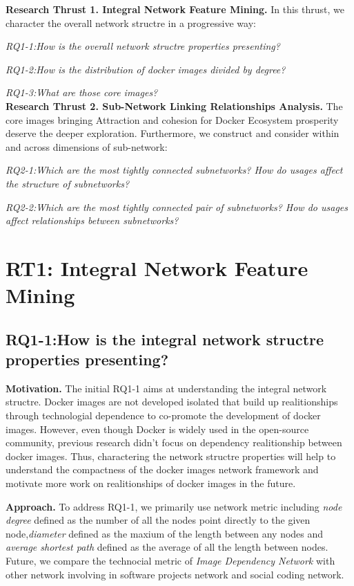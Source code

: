 \documentclass[sigconf]{acmart}
\begin{document}
\noindent\textbf{Research Thrust 1. Integral Network Feature Mining.} In this thrust, we character the overall network structre in a progressive way:

\emph{RQ1-1:How is the overall network structre properties presenting?}

\emph{RQ1-2:How is the distribution of docker images divided by degree?}

\emph{RQ1-3:What are those core images?}\\

\noindent\textbf{Research Thrust 2. Sub-Network Linking Relationships Analysis.} 
The core images bringing Attraction and cohesion for Docker Ecosystem prosperity deserve the deeper exploration. Furthermore, we construct and consider within and across dimensions of sub-network:

\emph{RQ2-1:Which are the most tightly connected subnetworks? How do usages affect the structure of subnetworks?}


\emph{RQ2-2:Which are the most tightly connected pair of subnetworks? How do usages affect relationships between subnetworks?}









\section{RT1: Integral Network Feature Mining}

\subsection{RQ1-1:How is the integral network structre properties presenting?}
\noindent\textbf{Motivation. }The initial RQ1-1 aims at understanding the integral network structre. Docker images are not developed isolated that build up realitionships through 
technologial dependence to co-promote the development of docker images. However, even though Docker is widely used in the open-source community, previous research didn't focus on dependency realitionship between docker images. Thus, charactering the network structre properties will help to understand the compactness of the docker images network framework and motivate more work on realitionships of docker images in the future.

\noindent\textbf{Approach. }To address RQ1-1, we primarily use network metric including \emph{node degree} defined as the number of all the nodes point directly to the given node,\emph{diameter} defined as the maxium of the length between any nodes and  \emph{average shortest path} defined as the average of all the length between nodes. Future, we compare the technocial metric of \emph{Image Dependency Network} with other network involving in software projects network and social coding network.
\end{document}
